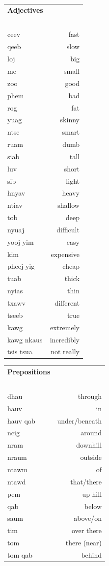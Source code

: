 \documentclass{article}
\begin{document}
\clearpage

\begin{multicols}{2}
[
\section*{}
\begin{center}\rule{\textwidth}{.4pt}\end{center}
]

\begin{tabular}{l r}
\textbf{Adjectives} \\
~\\
ceev &fast\\
qeeb &slow\\
loj &big\\
me &small\\
zoo &good\\
phem &bad\\
rog &fat\\
yuag &skinny\\
ntse &smart\\
ruam &dumb\\
siab &tall\\
luv &short\\
sib &light\\
hnyav &heavy\\
ntiav &shallow\\
tob &deep\\
nyuaj &difficult\\
yooj yim &easy\\
kim &expensive\\
pheej yig &cheap\\
tuab &thick\\
nyias &thin\\
txawv &different\\
tseeb &true\\
kawg &extremely\\
kawg nkaus &incredibly\\
tsis tsua &not really\\
\end{tabular}

\begin{tabular}{l r}
\textbf{Prepositions} \\
~\\
dhau &through\\
hauv &in\\
hauv qab &under/beneath\\
ncig &around\\
nram &downhill\\
nraum &outside\\
ntawm &of\\
ntawd &that/there\\
pem &up hill\\
qab &below\\
saum &above/on\\
tim &over there\\
tom &there (near)\\
tom qab &behind\\
\end{tabular}


\end{multicols}
\end{document}
